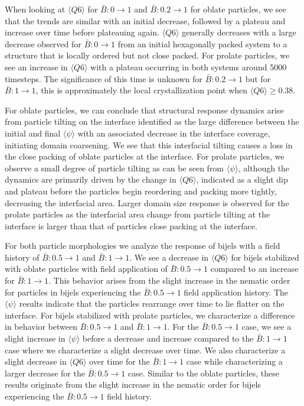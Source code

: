 When looking at $\langle Q6 \rangle$ for \(\bar{B}: 0 \rightarrow 1\)
and \(\bar{B}: 0.2 \rightarrow 1\) for oblate particles, we see that the
trends are similar with an initial decrease, followed by a plateau and
increase over time before plateauing again. $\langle Q6 \rangle$
generally decreases with a large decrease observed for
\(\bar{B}: 0 \rightarrow 1\) from an initial hexagonally packed system
to a structure that is locally ordered but not close packed. For prolate
particles, we see an increase in $\langle Q6 \rangle$ with a plateau
occurring in both systems around 5000 timesteps. The significance of
this time is unknown for \(\bar{B}: 0.2 \rightarrow 1\) but for
\(\bar{B}: 1 \rightarrow 1\), this is approximately the local
crystallization point when \(\langle Q6 \rangle \geq 0.38\).

For oblate particles, we can conclude that structural response dynamics
arise from particle tilting on the interface identified as the large
difference between the initial and final $\langle \psi \rangle$ with
an associated decrease in the interface coverage, initiating domain
coarsening. We see that this interfacial tilting causes a loss in the
close packing of oblate particles at the interface. For prolate
particles, we observe a small degree of particle tilting as can be seen
from $\langle \psi \rangle$, although the dynamics are primarily
driven by the change in $\langle Q6 \rangle$, indicated as a slight
dip and plateau before the particles begin reordering and packing more
tightly, decreasing the interfacial area. Larger domain size response is
observed for the prolate particles as the interfacial area change from
particle tilting at the interface is larger than that of particles close
packing at the interface.

For both particle morphologies we analyze the response of bijels with a
field history of \(\bar{B}: 0.5 \rightarrow 1\) and
\(\bar{B}: 1 \rightarrow 1\). We see a decrease in
$\langle Q6 \rangle$ for bijels stabilized with oblate particles with
field application of \(\bar{B}: 0.5 \rightarrow 1\) compared to an
increase for \(\bar{B}: 1 \rightarrow 1\). This behavior arises from the
slight increase in the nematic order for particles in bijels
experiencing the \(\bar{B}: 0.5 \rightarrow 1\) field application
history. The $\langle \psi \rangle$ results indicate that the
particles rearrange over time to lie flatter on the interface. For
bijels stabilized with prolate particles, we characterize a difference
in behavior between \(\bar{B}: 0.5 \rightarrow 1\) and
\(\bar{B}: 1 \rightarrow 1\). For the \(\bar{B}: 0.5 \rightarrow 1\)
case, we see a slight increase in $\langle \psi \rangle$ before a
decrease and increase compared to the \(\bar{B}: 1 \rightarrow 1\) case
where we characterize a slight decrease over time. We also characterize
a slight decrease in $\langle Q6 \rangle$ over time for the
\(\bar{B}: 1 \rightarrow 1\) case while characterizing a larger decrease
for the \(\bar{B}: 0.5 \rightarrow 1\) case. Similar to the oblate
particles, these results originate from the slight increase in the
nematic order for bijels experiencing the \(\bar{B}: 0.5 \rightarrow 1\)
field history.

